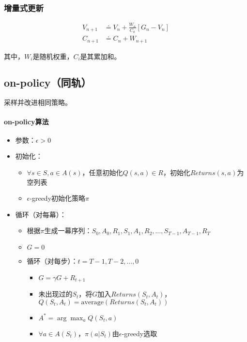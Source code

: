\documentclass[
12pt, %
a4paper, 
oneside, %
headinclude,footinclude, %
]{scrartcl}
\begin{document}
\subsubsection{增量式更新}
\begin{align*}
V_{n + 1} &\doteq V_n + \frac{W_n}{C_n}[G_n - V_n] \\
C_{n + 1} &\doteq C_n + W_{n + 1}
\end{align*}

其中，$ W_i $是随机权重，$ C_i $是其累加和。
\subsection{on-policy（同轨）}
采样并改进相同策略。
\paragraph{on-policy算法}
\begin{itemize}
\item 参数：$ \epsilon > 0 $
\item 初始化：
\begin{itemize}
\item $ \forall s \in S, a \in A(s) $，任意初始化$ Q(s,a) \in R $，初始化$ Returns(s,a) $为空列表
\item $ \epsilon $-greedy初始化策略$ \pi $
\end{itemize}
\item 循环（对每幕）：
\begin{itemize}
\item 根据$ \pi $生成一幕序列：$ S_0,A_0,R_1,S_1,A_1,R_2,\dots,S_{T - 1},A_{T - 1},R_T $
\item $ G = 0 $
\item 循环（对每步）：$ t = T - 1, T - 2, \dots, 0 $
\begin{itemize}
\item $ G = \gamma G + R_{t + 1} $ 
\item 未出现过的$ S_t $，将$ G $加入$ Returns(S_t,A_t) $，$ Q(S_t,A_t) = \text{average}(Returns(S_t,A_t)) $
\item $ A^* = \arg \max_a Q(S_t,a) $
\item $ \forall a \in A(S_t) $，$ \pi(a|S_t) $由$ \epsilon $-greedy选取
\end{itemize}
\end{itemize}
\end{itemize}
\end{document}
